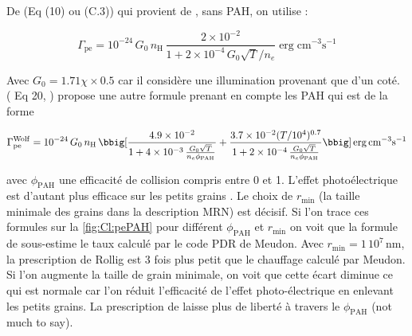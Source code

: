 De \cite{Rollig2005} (Eq (10) ou (C.3)) qui provient de \cite{BakesTielens1994}, sans PAH, on utilise : 

\begin{equation}
    \Gamma_{\mathrm{pe}} = 10^{-24}\,G_0\,n_\mathrm{H}\, \frac{2\times 10^{-2}}{1 + 2\times 10^{-4}\,G_0 \sqrt{T}/n_e} \operatorname{erg} \mathrm{cm}^{-3} \mathrm{s}^{-1}
\end{equation}

Avec $G_0 = 1.71\chi \times 0.5$ car il considère une illumination provenant que d'un coté. (\cite{Wolfire_2003} Eq 20, \cite{BakesTielens1994}) propose une autre formule prenant en compte les PAH qui est de la forme 

\begin{equation}
    \Gamma_{\mathrm{pe}}^{\mathrm{Wolf}} = 10^{-24}\,G_0\,n_\mathrm{H}\, \bbig[ \frac{4.9\times 10^{-2}}{1 + 4\times 10^{-3}\, \frac{G_0 \sqrt{T}}{n_e \phi_\mathrm{PAH}}} + \frac{3.7\times 10^{-2} (T/10^4)^{0.7}}{1 + 2\times 10^{-4}\, \frac{G_0 \sqrt{T}}{n_e \phi_\mathrm{PAH}}} \bbig] \operatorname{erg} \mathrm{cm}^{-3} \mathrm{s}^{-1}
\end{equation}

avec $\phi_\mathrm{PAH}$ une efficacité de collision compris entre 0 et 1. L'effet photoélectrique est d'autant plus efficace sur les petits grains \cite{DraineBook}. Le choix de $r_\mathrm{min}$ (la taille minimale des grains dans la description MRN) est décisif. Si l'on trace ces formules sur la \autoref{fig:Cl:pePAH} pour différent $\phi_\mathrm{PAH}$ et $r_\mathrm{min}$ on voit que la formule de \cite{Rollig2005} sous-estime le taux calculé par le code PDR de Meudon. Avec $r_\mathrm{min} = 1\,10^7\,\mathrm{nm}$, la prescription de Rollig est 3 fois plus petit que le chauffage calculé par Meudon. Si l'on augmente la taille de grain minimale, on voit que cette écart diminue ce qui est normale car l'on réduit l'efficacité de l'effet photo-électrique en enlevant les petits grains. La prescription de \cite{Wolfire_2003} laisse plus de liberté à travers le $\phi_\mathrm{PAH}$ (not much to say).

